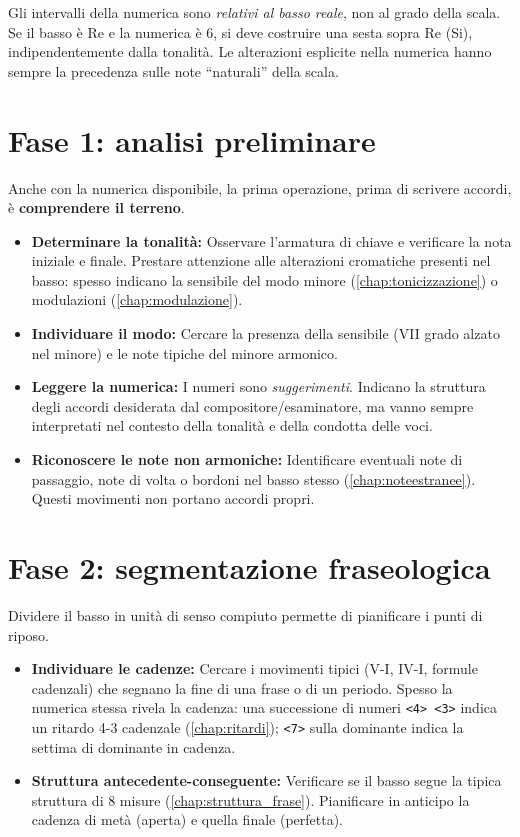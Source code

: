 \begin{osservazione}
	\label{oss:numerica_relativa}
	Gli intervalli della numerica sono \textit{relativi al basso reale}, non al grado della scala. Se il basso è Re e la numerica è 6, si deve costruire una sesta sopra Re (Si), indipendentemente dalla tonalità. Le alterazioni esplicite nella numerica hanno sempre la precedenza sulle note ``naturali'' della scala.
\end{osservazione}

\section{Fase 1: analisi preliminare}
\label{sec:fase1_numerato}

Anche con la numerica disponibile, la prima operazione, prima di scrivere accordi, è \textbf{comprendere il terreno}.

\begin{itemize}
	\item \textbf{Determinare la tonalità:} Osservare l'armatura di chiave e verificare la nota iniziale e finale. Prestare attenzione alle alterazioni cromatiche presenti nel basso: spesso indicano la sensibile del modo minore (\ref{chap:tonicizzazione}) o modulazioni (\ref{chap:modulazione}).
	\item \textbf{Individuare il modo:} Cercare la presenza della sensibile (VII grado alzato nel minore) e le note tipiche del minore armonico.
	\item \textbf{Leggere la numerica:} I numeri sono \textit{suggerimenti}. Indicano la struttura degli accordi desiderata dal compositore/esaminatore, ma vanno sempre interpretati nel contesto della tonalità e della condotta delle voci.
	\item \textbf{Riconoscere le note non armoniche:} Identificare eventuali note di passaggio, note di volta o bordoni nel basso stesso (\ref{chap:noteestranee}). Questi movimenti non portano accordi propri.
\end{itemize}

\section{Fase 2: segmentazione fraseologica}
\label{sec:fase2_numerato}

Dividere il basso in unità di senso compiuto permette di pianificare i punti di riposo.

\begin{itemize}
	\item \textbf{Individuare le cadenze:} Cercare i movimenti tipici (V-I, IV-I, formule cadenzali) che segnano la fine di una frase o di un periodo. Spesso la numerica stessa rivela la cadenza: una successione di numeri \texttt{<4> <3>} indica un ritardo 4-3 cadenzale (\ref{chap:ritardi}); \texttt{<7>} sulla dominante indica la settima di dominante in cadenza.
	\item \textbf{Struttura antecedente-conseguente:} Verificare se il basso segue la tipica struttura di 8 misure (\ref{chap:struttura_frase}). Pianificare in anticipo la cadenza di metà (aperta) e quella finale (perfetta).
\end{itemize}

